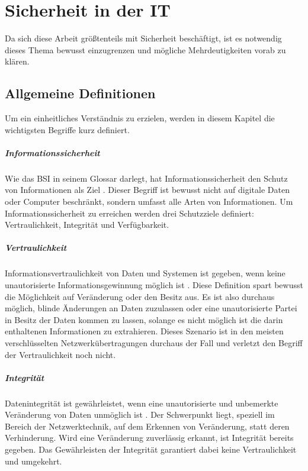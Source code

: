\chapter{Sicherheit in der IT}
\label{chap:itsecurity}
Da sich diese Arbeit größtenteils mit Sicherheit beschäftigt, ist es notwendig dieses Thema bewusst einzugrenzen und mögliche Mehrdeutigkeiten vorab zu klären.

\section{Allgemeine Definitionen}
Um ein einheitliches Verständnis zu erzielen, werden in diesem Kapitel die wichtigsten Begriffe kurz definiert.

\paragraph{Informationssicherheit}
Wie das \ac{BSI} in seinem Glossar darlegt, hat Informationssicherheit den Schutz von Informationen als Ziel \cite{BSIGlossar}. Dieser Begriff ist bewusst nicht auf digitale Daten oder Computer beschränkt, sondern umfasst alle Arten von Informationen. Um Informationssicherheit zu erreichen werden drei Schutzziele definiert: Vertraulichkeit, Integrität und Verfügbarkeit.

\paragraph{Vertraulichkeit}
Informationsvertraulichkeit von Daten und Systemen ist gegeben, wenn keine unautorisierte Informationsgewinnung möglich ist \cite[p. 10]{Eckert2013}. Diese Definition spart bewusst die Möglichkeit auf Veränderung oder den Besitz aus. Es ist also durchaus möglich, blinde Änderungen an Daten zuzulassen oder eine unautorisierte Partei in Besitz der Daten kommen zu lassen, solange es nicht möglich ist die darin enthaltenen Informationen zu extrahieren. Dieses Szenario ist in den meisten verschlüsselten Netzwerkübertragungen durchaus der Fall und verletzt den Begriff der Vertraulichkeit noch nicht.    

\paragraph{Integrität}
Datenintegrität ist gewährleistet, wenn eine unautorisierte und unbemerkte Veränderung von Daten unmöglich ist \cite[p. 9]{Eckert2013}. Der Schwerpunkt liegt, speziell im Bereich der Netzwerktechnik, auf dem Erkennen von Veränderung, statt deren Verhinderung. Wird eine Veränderung zuverlässig erkannt, ist Integrität bereits gegeben. Das Gewährleisten der Integrität garantiert dabei keine Vertraulichkeit und umgekehrt.

